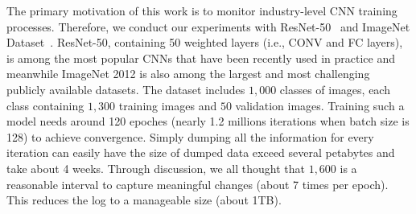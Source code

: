 \documentclass[format=acmsmall, review=false, screen=true]{acmart}
\begin{document}
The primary motivation of this work is to monitor industry-level CNN training processes. Therefore, we conduct our experiments with ResNet-50~\cite{he2016deep} and ImageNet Dataset~\cite{russakovsky2015imagenet}.
ResNet-50, containing 50 weighted layers (i.e., CONV and FC layers), is among the most popular CNNs that have been recently used in practice and meanwhile ImageNet 2012 is also among the largest and most challenging publicly available datasets.
The dataset includes $1,000$ classes of images, each class containing $1,300$ training images and $50$ validation images.
Training such a model needs around 120 epoches (nearly 1.2 millions iterations when batch size is 128) to achieve convergence.
Simply dumping all the information for every iteration can easily have the size of dumped data exceed several petabytes and take about 4 weeks. Through discussion, we all thought that $1,600$ is a reasonable interval to capture meaningful changes (about 7 times per epoch). This reduces the log to a manageable size (about 1TB).
\end{document}
